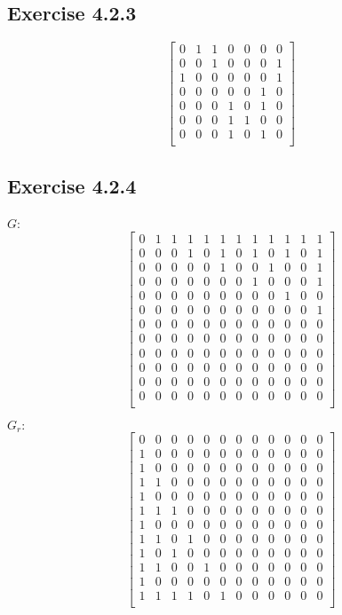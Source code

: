 \documentclass{article}
\begin{document}
\subsection*{Exercise 4.2.3}

\[\left[
	\begin{array}{ccccccc}
	0& 1& 1& 0& 0& 0& 0 \\
	0& 0& 1& 0& 0& 0& 1 \\
	1& 0& 0& 0& 0& 0& 1 \\
	0& 0& 0& 0& 0& 1& 0 \\
	0& 0& 0& 1& 0& 1& 0 \\
	0& 0& 0& 1& 1& 0& 0 \\
	0& 0& 0& 1& 0& 1& 0 \\
	\end{array}
\right]\]


\subsection*{Exercise 4.2.4}

\(G\):
\[\left[
	\begin{array}{cccccccccccc}
	0& 1& 1& 1& 1& 1& 1& 1& 1& 1& 1& 1 \\
	0& 0& 0& 1& 0& 1& 0& 1& 0& 1& 0& 1 \\
	0& 0& 0& 0& 0& 1& 0& 0& 1& 0& 0& 1 \\
	0& 0& 0& 0& 0& 0& 0& 1& 0& 0& 0& 1 \\
	0& 0& 0& 0& 0& 0& 0& 0& 0& 1& 0& 0 \\
	0& 0& 0& 0& 0& 0& 0& 0& 0& 0& 0& 1 \\
	0& 0& 0& 0& 0& 0& 0& 0& 0& 0& 0& 0 \\
	0& 0& 0& 0& 0& 0& 0& 0& 0& 0& 0& 0 \\
	0& 0& 0& 0& 0& 0& 0& 0& 0& 0& 0& 0 \\
	0& 0& 0& 0& 0& 0& 0& 0& 0& 0& 0& 0 \\
	0& 0& 0& 0& 0& 0& 0& 0& 0& 0& 0& 0 \\
	0& 0& 0& 0& 0& 0& 0& 0& 0& 0& 0& 0 \\
	\end{array}
\right]\]

\(G_r:\)
\[\left[
	\begin{array}{cccccccccccc}
	0&0&0&0&0&0&0&0&0&0&0&0 \\
	1&0&0&0&0&0&0&0&0&0&0&0 \\
	1&0&0&0&0&0&0&0&0&0&0&0 \\
	1&1&0&0&0&0&0&0&0&0&0&0 \\
	1&0&0&0&0&0&0&0&0&0&0&0 \\
	1&1&1&0&0&0&0&0&0&0&0&0 \\
	1&0&0&0&0&0&0&0&0&0&0&0 \\
	1&1&0&1&0&0&0&0&0&0&0&0 \\
	1&0&1&0&0&0&0&0&0&0&0&0 \\
	1&1&0&0&1&0&0&0&0&0&0&0 \\
	1&0&0&0&0&0&0&0&0&0&0&0 \\
	1&1&1&1&0&1&0&0&0&0&0&0 \\
	\end{array}
\right]\]
\end{document}
